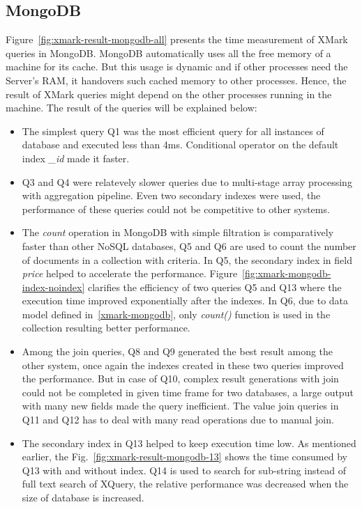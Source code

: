 \subsection{MongoDB}
Figure~\ref{fig:xmark-result-mongodb-all} presents the time measurement of XMark queries in MongoDB. MongoDB automatically uses all the free memory of a machine for its cache. But this usage is dynamic and if other processes need the Server's RAM, it handovers such cached memory to other processes. Hence, the result of XMark queries might depend on the other processes running in the machine.  The result of the queries will be explained below:
\begin{itemize}
\item The simplest query Q1 was the most efficient query for all instances of database and executed less than 4ms. Conditional operator on the default index \textit{\_id} made it faster.
\item Q3 and Q4 were relatevely slower queries due to multi-stage array processing with aggregation pipeline. Even two secondary indexes were used, the performance of these queries could not be competitive to other systems. 
\item The \textit{count} operation in MongoDB with simple filtration is comparatively faster than other NoSQL databases, Q5 and Q6 are used to count the number of documents in a collection with criteria. In Q5, the secondary index in field \textit{price}  helped to accelerate the performance. Figure~\ref{fig:xmark-mongodb-index-noindex} clarifies the efficiency of two queries Q5 and Q13 where the execution time improved exponentially after the indexes. In Q6, due to data model defined in~\ref{xmark-mongodb}, only \textit{count()} function is used in the collection resulting better performance.

\item Among the join queries, Q8 and Q9 generated the best result among the other system, once again the indexes created in these two queries improved the performance. 
But in case of Q10, complex result generations with join could not be completed in given time frame for two databases, a large output with many new fields made the query inefficient. The value join queries in Q11 and Q12 has to deal with many read operations due to manual join.

\item The secondary index in Q13 helped to keep execution time low. As mentioned earlier, the Fig.~\ref{fig:xmark-result-mongodb-13} shows the time consumed by Q13  with and without index. Q14 is used to search for sub-string instead of full text search of XQuery, the relative performance was decreased when the size of database is increased.


\end{itemize}
